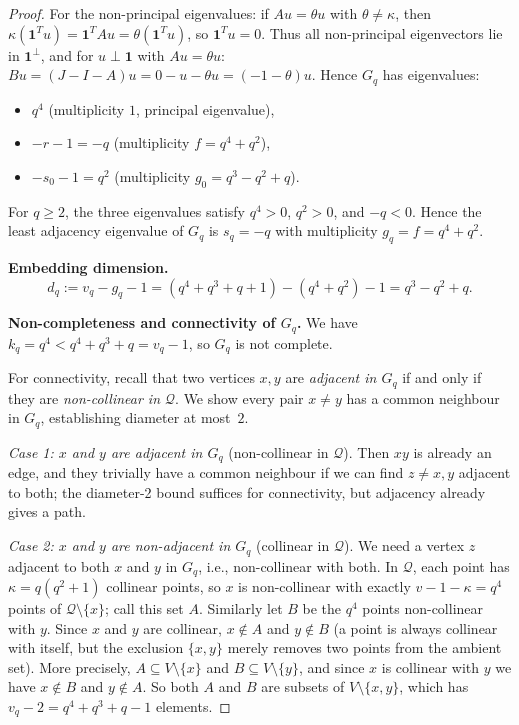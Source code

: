 \documentclass{article}
\theoremstyle{definition}
\begin{document}
\begin{proof}
For the non-principal eigenvalues: if $Au=\theta u$ with $\theta\ne\kappa$, then $\kappa(\mathbf{1}^Tu)=\mathbf{1}^T A u=\theta(\mathbf{1}^Tu)$, so $\mathbf{1}^Tu=0$. Thus all non-principal eigenvectors lie in $\mathbf{1}^\perp$, and for $u\perp\mathbf{1}$ with $Au=\theta u$: $Bu=(J-I-A)u=0-u-\theta u=(-1-\theta)u$. Hence $G_q$ has eigenvalues:
\begin{itemize}
  \item $q^4$ (multiplicity $1$, principal eigenvalue),
  \item $-r-1=-q$ (multiplicity $f=q^4+q^2$),
  \item $-s_0-1=q^2$ (multiplicity $g_0=q^3-q^2+q$).
\end{itemize}

For $q\ge 2$, the three eigenvalues satisfy $q^4>0$, $q^2>0$, and $-q<0$. Hence the least adjacency eigenvalue of $G_q$ is $s_q=-q$ with multiplicity $g_q=f=q^4+q^2$.

\textbf{Embedding dimension.}
\[
d_q:=v_q-g_q-1=(q^4+q^3+q+1)-(q^4+q^2)-1=q^3-q^2+q.
\]

\textbf{Non-completeness and connectivity of $G_q$.} We have $k_q=q^4<q^4+q^3+q=v_q-1$, so $G_q$ is not complete.

For connectivity, recall that two vertices $x,y$ are \emph{adjacent in $G_q$} if and only if they are \emph{non-collinear in $\mathcal{Q}$}. We show every pair $x\ne y$ has a common neighbour in $G_q$, establishing diameter at most~$2$.

\emph{Case 1: $x$ and $y$ are adjacent in $G_q$} (non-collinear in $\mathcal{Q}$). Then $xy$ is already an edge, and they trivially have a common neighbour if we can find $z\ne x,y$ adjacent to both; the diameter-2 bound suffices for connectivity, but adjacency already gives a path.

\emph{Case 2: $x$ and $y$ are non-adjacent in $G_q$} (collinear in $\mathcal{Q}$). We need a vertex $z$ adjacent to both $x$ and $y$ in $G_q$, i.e., non-collinear with both. In $\mathcal{Q}$, each point has $\kappa=q(q^2+1)$ collinear points, so $x$ is non-collinear with exactly $v-1-\kappa=q^4$ points of $\mathcal{Q}\setminus\{x\}$; call this set $A$. Similarly let $B$ be the $q^4$ points non-collinear with $y$. Since $x$ and $y$ are collinear, $x\notin A$ and $y\notin B$ (a point is always collinear with itself, but the exclusion $\{x,y\}$ merely removes two points from the ambient set). More precisely, $A\subseteq V\setminus\{x\}$ and $B\subseteq V\setminus\{y\}$, and since $x$ is collinear with $y$ we have $x\notin B$ and $y\notin A$. So both $A$ and $B$ are subsets of $V\setminus\{x,y\}$, which has $v_q-2=q^4+q^3+q-1$ elements.


\end{proof}
\end{document}
